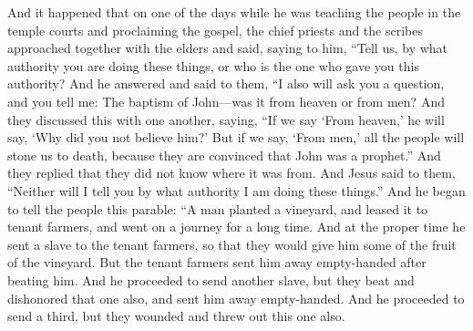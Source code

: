 \begin{biblechapter} %
 And it happened that on one of the days while he was teaching the people in the temple courts and proclaiming the gospel, the chief priests and the scribes approached together with the elders
\verse and said, saying to him, “Tell us, by what authority you are doing these things, or who is the one who gave you this authority?
\verse And he answered and said to them, “I also will ask you a question, and you tell me:
\verse The baptism of John—was it from heaven or from men?
\verse And they discussed this with one another, saying, “If we say ‘From heaven,’ he will say, ‘Why did you not believe him?’
\verse But if we say, ‘From men,’ all the people will stone us to death, because they are convinced that John was a prophet.”
\verse And they replied that they did not know where it was from.
\verse And Jesus said to them, “Neither will I tell you by what authority I am doing these things.”
 And he began to tell the people this parable: “A man planted a vineyard, and leased it to tenant farmers, and went on a journey for a long time.
\verse And at the proper time he sent a slave to the tenant farmers, so that they would give him some of the fruit of the vineyard. But the tenant farmers sent him away empty-handed after beating him.
\verse And he proceeded to send another slave, but they beat and dishonored that one also, and sent him away empty-handed.
\verse And he proceeded to send a third, but they wounded and threw out this one also.

\end{biblechapter}
